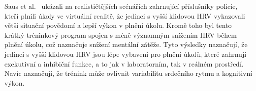 Saus et al.~\cite{Saus_Johnsen_Eid_Riisem_Andersen_Thayer_2006} ukázali na
realističtějších scénářích zahrnující příslušníky policie, kteří plnili úkoly ve
virtuální realitě, že jedinci s vyšší klidovou \gls{HRV} vykazovali větší
situační povědomí a lepší výkon v plnění úkolu. Kromě toho byl tento krátký
tréninkový program spojen s méně významným snížením \gls{HRV} během plnění
úkolu, což naznačuje snížení mentální zátěže. Tyto výsledky naznačují, že
jedinci s vyšší klidovou \gls{HRV} jsou lépe vybaveni pro plnění úkolů, které
zahrnují exekutivní a inhibiční funkce, a to jak v laboratorním, tak v reálném
prostředí. Navíc naznačují, že trénink může ovlivnit variabilitu srdečního rytmu
a kognitivní výkon.